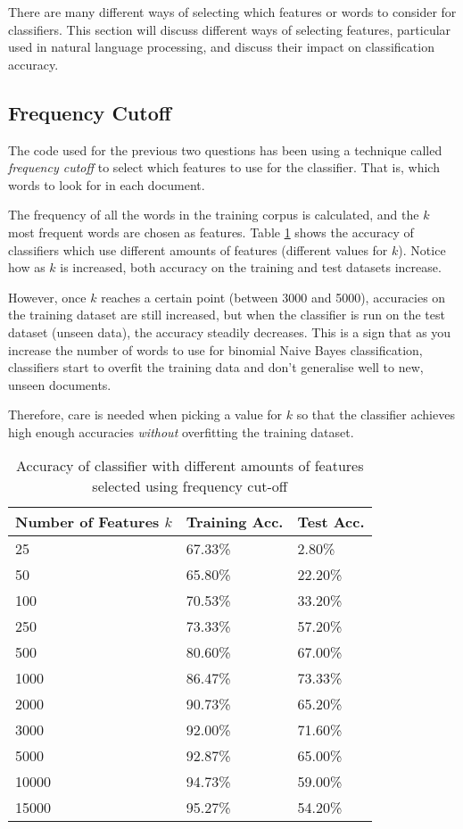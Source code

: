 \documentclass{article}
\begin{document}
There are many different ways of selecting which features or words to consider for classifiers. This section will discuss different ways of selecting features, particular used in natural language processing, and discuss their impact on classification accuracy.

\subsection{Frequency Cutoff}

The code used for the previous two questions has been using a technique called \textit{frequency cutoff} to select which features to use for the classifier. That is, which words to look for in each document.

The frequency of all the words in the training corpus is calculated, and the $k$ most frequent words are chosen as features. Table \ref{tab:frequency_cutoff} shows the accuracy of classifiers which use different amounts of features (different values for $k$). Notice how as $k$ is increased, both accuracy on the training and test datasets increase.

However, once $k$ reaches a certain point (between 3000 and 5000),  accuracies on the training dataset are still increased, but when the classifier is run on the test dataset (unseen data), the accuracy steadily decreases. This is a sign that as you increase the number of words to use for binomial Naive Bayes classification, classifiers start to overfit the training data and don't generalise well to new, unseen documents.

Therefore, care is needed when picking a value for $k$ so that the classifier achieves high enough accuracies \textit{without} overfitting the training dataset.

\begin{table}
	\centering
	\begin{tabular}{|l|l|l|}
	\hline
	\textbf{Number of Features $k$} & \textbf{Training Acc.} & \textbf{Test Acc.} \\
	\hline
	25 & 67.33\% & 2.80\% \\
	50 & 65.80\% & 22.20\% \\
	100 & 70.53\% & 33.20\% \\
	250 & 73.33\% & 57.20\% \\
	500 & 80.60\% & 67.00\% \\
	1000 & 86.47\% & 73.33\% \\
	2000 & 90.73\% & 65.20\% \\
	3000 & 92.00\% & 71.60\% \\
	5000 & 92.87\% & 65.00\% \\
	10000 & 94.73\% & 59.00\% \\
	15000 & 95.27\% & 54.20\% \\	
	\hline
	\end{tabular}
	\caption{Accuracy of classifier with different amounts of features selected using frequency cut-off}
	\label{tab:frequency_cutoff}
\end{table}
\end{document}
